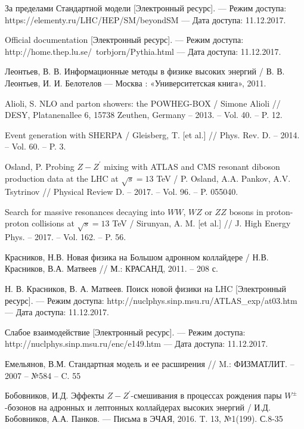 
	За пределами Стандартной модели
	[Электронный ресурс].
	— Режим доступа: https://elementy.ru/LHC/HEP/SM/beyondSM 
	— Да­та доступа: 11.12.2017.

	Official documentation
	[Электронный ресурс].
	— Режим доступа: http://home.thep.lu.se/~torbjorn/Pythia.html 
	— Дата доступа: 11.12.2017.

	Леонтьев, В. В. 
	Информационные методы в физике высоких энергий 
	/ В. В. Леонтьев, И. И. Белотелов 
	— Москва : «Университетская книга», 2011.

	Alioli, S. NLO and parton showers: the POWHEG-BOX
	/ Simone Alioli 
	// DESY, Platanenallee 6, 15738 Zeuthen, Germany – 2013. – Vol. 40. – P. 12.

	Event generation with SHERPA
	/ Gleisberg, T. [et al.]  
	// Phys. Rev. D. – 2014. – Vol. 60. – P. 3.

	Osland, P. Probing $Z-Z^\prime$ mixing with ATLAS and CMS resonant diboson production data at the LHC at $\sqrt{s}=13$ TeV
	/ P. Osland, A.A. Pankov, A.V. Tsytrinov 
	// Physical Review D. – 2017. – Vol. 96. – P. 055040.
	
	Search for massive resonances decaying into $WW$, $WZ$ or $ZZ$ bosons in proton-proton collisions at $\sqrt{s}=13$ TeV
	/ Sirunyan, A. M. [et al.] 
	// J. High Energy Phys. – 2017. – Vol. 162. – P. 56.
	
	Красников, Н.В. Новая физика на Большом адронном коллайдере / Н.В. Красников, В.А. Матвеев  
	// М.: КРАСАНД, 2011. – 208 с.
	
	Н. В. Красников, В. А. 
	Матвеев. Поиск новой физики на LHC
	[Электронный ресурс].
	— Режим доступа: http://nuclphys.sinp.msu.ru/ATLAS\_exp/at03.htm 
	— Дата доступа: 11.12.2017.
	
	Слабое взаимодействие 
	[Электронный ресурс].
	— Режим доступа: http://nuclphys.sinp.msu.ru/enc/e149.htm
	— Дата доступа: 11.12.2017.
	
	Емельянов, В.М. Стандартная модель и ее расширения 
	// M.: ФИЗМАТЛИТ. -- 2007 – №584 – C. 55
	
	Бобовников, И.Д. Эффекты $Z-Z^\prime$-смешивания в процессах рождения пары $W^±$-бозонов на адронных и лептонных коллайдерах высоких энергий
	/ И.Д. Бобовников, А.А. Панков.
	— Письма в ЭЧАЯ, 2016. T. 13, №1(199). С.8-35
	
